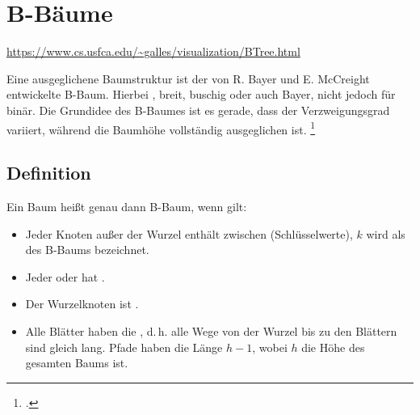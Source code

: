\documentclass{lehramt-informatik-haupt}
\begin{document}

\chapter{B-Bäume}

\begin{liQuellen}
\item \cite{wiki:bbaum}
\item \cite[Kapitel 14.4.3, Seite 386-399 (PDF 402-415)]{saake}
\item \cite[Kapitel 13.5.4.2 Balancierte Mehrwegbäume, Seite 464, wird
nur erwähnt, nicht beschrieben]{schneider}
\end{liQuellen}

\url{https://www.cs.usfca.edu/~galles/visualization/BTree.html}

\noindent
Eine ausgeglichene Baumstruktur ist der von R. Bayer und E. McCreight
entwickelte B-Baum. Hierbei ,
breit, buschig oder auch Bayer, nicht jedoch für binär. Die Grundidee
des B-Baumes ist es gerade, dass der Verzweigungsgrad variiert, während
die Baumhöhe vollständig ausgeglichen ist.
\footcite[Seite 386]{saake}

%

\section{Definition}

Ein Baum heißt genau dann B-Baum, wenn gilt:
%

\begin{itemize}
\item Jeder Knoten außer der Wurzel enthält zwischen  (Schlüsselwerte), $k$ wird als  des B-Baums
bezeichnet.
%
\item Jeder  oder hat
.
%
\item Der Wurzelknoten ist .
%
\item Alle Blätter haben die , d.\,h. alle Wege von
der Wurzel bis zu den Blättern sind gleich lang. Pfade haben die Länge
$h-1$, wobei $h$ die Höhe des gesamten Baums ist.
\end{itemize}
\end{document}
